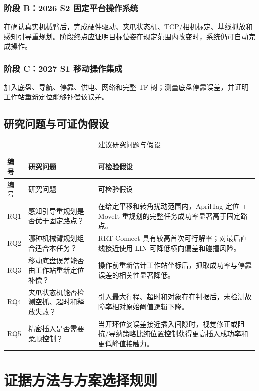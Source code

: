 \documentclass[UTF8,12pt,oneside]{ctexrep}
\begin{document}
\subsection{阶段 B：2026 S2 固定平台操作系统}

在确认真实机械臂后，完成硬件驱动、夹爪状态机、TCP/相机标定、基线抓放和感知引导重规划。阶段终点应证明目标位姿在规定范围内改变时，系统仍可自动完成操作。

\subsection{阶段 C：2027 S1 移动操作集成}

加入底盘、导航、停靠、供电、网络和完整 TF 树；测量底盘停靠误差，并证明工作站重新定位能够补偿该误差。

\section{研究问题与可证伪假设}

\begin{longtable}{L{1.2cm}L{5.4cm}L{7.8cm}}
\caption{建议研究问题与假设}\label{tab:rq}\\
\toprule
编号 & 研究问题 & 可检验假设 \\
\midrule
\endfirsthead
\toprule
编号 & 研究问题 & 可检验假设 \\
\midrule
\endhead
RQ1 & 感知引导重规划是否优于固定路点？ & 在给定平移和转角扰动范围内，AprilTag 定位 + MoveIt 重规划的完整任务成功率显著高于固定路点。 \\
RQ2 & 哪种机械臂规划组合适合本任务？ & RRT-Connect 具有较高首次可行解率；对最后直线接近使用 LIN 可降低横向偏差和碰撞风险。 \\
RQ3 & 移动底盘误差能否由工作站重新定位补偿？ & 操作前重新估计工作站坐标后，抓取成功率与停靠误差的相关性显著降低。 \\
RQ4 & 夹爪状态机能否检测空抓、超时和释放失败？ & 引入最大行程、超时和对象存在判据后，未检测故障率相对原始阈值逻辑下降。 \\
RQ5 & 精密插入是否需要柔顺控制？ & 当开环位姿误差接近插入间隙时，视觉修正或阻抗/导纳策略比纯位置控制获得更高插入成功率和更低峰值接触力。 \\
\bottomrule
\end{longtable}

\chapter{证据方法与方案选择规则}
\end{document}
